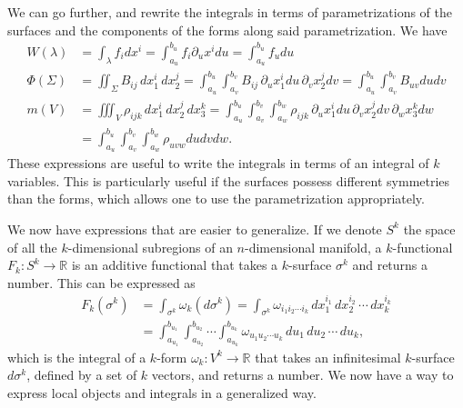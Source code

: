 We can go further, and rewrite the integrals in terms of parametrizations of the surfaces and the components of the forms along said parametrization. We have
\begin{equation}
	\begin{aligned}
		W(\lambda) &= \int_\lambda f_i dx^i = \int_{a_u}^{b_u} f_i \partial_u x^i du = \int_{a_u}^{b_u} f_u du \\
		\Phi(\Sigma) &= \iint_\Sigma B_{ij} \, dx_1^i \, dx_2^j = \int_{a_u}^{b_u} \int_{a_v}^{b_v} B_{ij} \, \partial_u x_1^i du \, \partial_v x_2^j dv = \int_{a_u}^{b_u} \int_{a_v}^{b_v} B_{uv} du dv \\
		m(V) &= \iiint_V \rho_{ijk} \, dx_1^i \, dx_2^j \, dx_3^k = \int_{a_u}^{b_u} \int_{a_v}^{b_v} \int_{a_w}^{b_w} \rho_{ijk} \,  \partial_u x_1^i du \, \partial_v x_2^j dv \, \partial_w x_3^k dw \\
		&= \int_{a_u}^{b_u} \int_{a_v}^{b_v} \int_{a_w}^{b_w} \rho_{uvw} du dv dw.
	\end{aligned}
\end{equation}
These expressions are useful to write the integrals in terms of an integral of $k$ variables. This is particularly useful if the surfaces possess different symmetries than the forms, which allows one to use the parametrization appropriately.

We now have expressions that are easier to generalize. If we denote $S^k$ the space of all the $k$-dimensional subregions of an $n$-dimensional manifold, a $k$-functional $F_k : S^k \to \mathbb{R}$ is an additive functional that takes a $k$-surface $\sigma^k$ and returns a number. This can be expressed as
\begin{equation}
	\begin{aligned}
		F_k(\sigma^k) &= \int_{\sigma^k} \omega_k (d\sigma^k) = \int_{\sigma^k} \omega_{i_1 i_2 \cdots i_k} \, dx_1^{i_1} \, dx_2^{i_2} \, \cdots \, dx_k^{i_k} \\
		&= \int_{a_{u_1}}^{b_{u_1}} \int_{a_{u_2}}^{b_{u_2}} \cdots \int_{a_{u_k}}^{b_{u_k}} \omega_{u_1 u_2 \cdots u_k} \, du_1 \, du_2 \, \cdots \, du_k,
	\end{aligned}
\end{equation}
which is the integral of a $k$-form $\omega_k : V^k \to \mathbb{R}$ that takes an infinitesimal $k$-surface $d\sigma^k$, defined by a set of $k$ vectors, and returns a number. We now have a way to express local objects and integrals in a generalized way.

